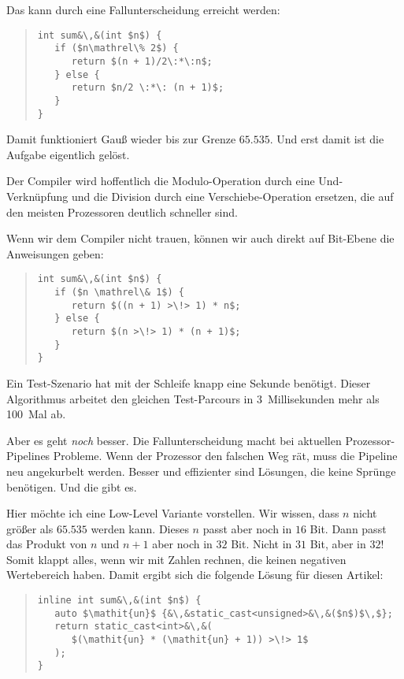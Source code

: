 \documentclass[a5paper,landscape,ngerman,10pt]{article}
\begin{document}
Das kann durch eine Fallunterscheidung erreicht werden:

\begin{quotation}
\begin{lstlisting}
int sum&\,&(int $n$) {
   if ($n\mathrel\% 2$) {
      return $(n + 1)/2\:*\:n$;
   } else {
      return $n/2 \:*\: (n + 1)$;
   }
}
\end{lstlisting}
\end{quotation}

Damit funktioniert Gauß wieder bis zur Grenze $65.535$.
Und erst damit ist die Aufgabe eigentlich gelöst.

Der Compiler wird hoffentlich die Modulo-Operation durch eine
Und-Verknüpfung und die Division durch eine
Verschiebe-Operation ersetzen, die auf den meisten
Prozessoren deutlich schneller sind.

Wenn wir dem Compiler nicht trauen, können wir auch direkt
auf Bit-Ebene die Anweisungen geben:

\begin{quotation}
\begin{lstlisting}
int sum&\,&(int $n$) {
   if ($n \mathrel\& 1$) {
      return $((n + 1) >\!> 1) * n$;
   } else {
      return $(n >\!> 1) * (n + 1)$;
   }
}
\end{lstlisting}
\end{quotation}

Ein Test-Szenario hat mit der Schleife knapp eine Sekunde benötigt.
Dieser Algorithmus arbeitet den gleichen Test-Parcours in 3~Millisekunden
mehr als 100~Mal ab.

Aber es geht \textit{noch\/} besser.
Die Fallunterscheidung macht bei aktuellen Prozessor-Pipelines
Probleme.
Wenn der Prozessor den falschen Weg rät, muss die
Pipeline neu angekurbelt werden.
Besser und effizienter sind Lösungen, die keine
Sprünge benötigen.
Und die gibt es.

Hier möchte ich eine Low-Level Variante vorstellen.
Wir wissen, dass $n$ nicht größer als $65.535$ werden
kann.
Dieses $n$ passt aber noch in $16$ Bit.
Dann passt das Produkt von $n$ und $n+1$ aber noch in
$32$ Bit.
Nicht in $31$ Bit, aber in $32$!
Somit klappt alles, wenn wir mit Zahlen rechnen, die
keinen negativen Wertebereich haben.
Damit ergibt sich die folgende Lösung für diesen Artikel:

\begin{quotation}
\begin{lstlisting}[frame=single,linewidth=6.1cm]
inline int sum&\,&(int $n$) {
   auto $\mathit{un}$ {&\,&static_cast<unsigned>&\,&($n$)$\,$};
   return static_cast<int>&\,&(
      $(\mathit{un} * (\mathit{un} + 1)) >\!> 1$
   );
}
\end{lstlisting}
\end{quotation}
\end{document}
